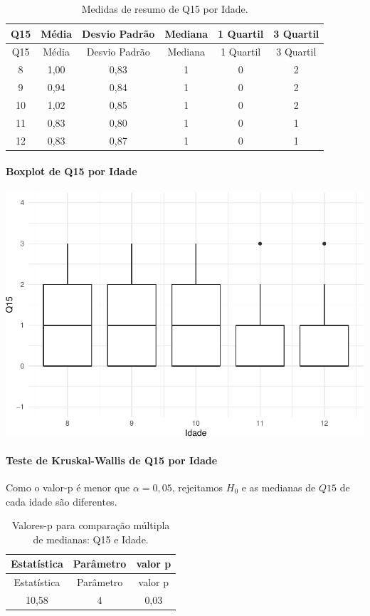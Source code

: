 \documentclass[]{article}
\let\oldparagraph\paragraph
\renewcommand{\paragraph}[1]{\oldparagraph{#1}\mbox{}}
\begin{document}
\begin{longtable}[]{@{}cccccc@{}}
\caption{\label{tab:unnamed-chunk-115}Medidas de resumo de Q15 por Idade.}\tabularnewline
\toprule
Q15 & Média & Desvio Padrão & Mediana & 1 Quartil & 3 Quartil\tabularnewline
\midrule
\endfirsthead
\toprule
Q15 & Média & Desvio Padrão & Mediana & 1 Quartil & 3 Quartil\tabularnewline
\midrule
\endhead
8 & 1,00 & 0,83 & 1 & 0 & 2\tabularnewline
9 & 0,94 & 0,84 & 1 & 0 & 2\tabularnewline
10 & 1,02 & 0,85 & 1 & 0 & 2\tabularnewline
11 & 0,83 & 0,80 & 1 & 0 & 1\tabularnewline
12 & 0,83 & 0,87 & 1 & 0 & 1\tabularnewline
\bottomrule
\end{longtable}

\hypertarget{boxplot-de-q15-por-idade}{%
\paragraph{Boxplot de Q15 por Idade}\label{boxplot-de-q15-por-idade}}

\begin{center}\includegraphics[width=0.75\linewidth]{relatorio_files/figure-latex/unnamed-chunk-116-1} \end{center}

\hypertarget{teste-de-kruskal-wallis-de-q15-por-idade}{%
\paragraph{Teste de Kruskal-Wallis de Q15 por Idade}\label{teste-de-kruskal-wallis-de-q15-por-idade}}

Como o valor-p é menor que \(\alpha=0,05\), rejeitamos \(H_0\) e as medianas de \(Q15\) de cada idade são diferentes.

\begin{longtable}[]{@{}ccc@{}}
\caption{\label{tab:unnamed-chunk-117}Valores-p para comparação múltipla de medianas: Q15 e Idade.}\tabularnewline
\toprule
Estatística & Parâmetro & valor p\tabularnewline
\midrule
\endfirsthead
\toprule
Estatística & Parâmetro & valor p\tabularnewline
\midrule
\endhead
10,58 & 4 & 0,03\tabularnewline
\bottomrule
\end{longtable}
\end{document}
